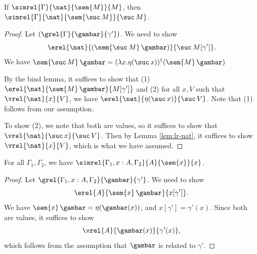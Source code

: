\begin{lemma}
    If $\simrel{\Gamma}{\nat}{\sem{M}}{M}$, then
    $\simrel{\Gamma}{\nat}{\sem{\suc\, M}}{\suc\, M}$.
\end{lemma}
\begin{proof}
    Let $(\grel{\Gamma} {\gambar} {\gamma'})$. We need to show 
    \[ \erel{\nat} {(\sem{\suc\, M}\, \gambar)} {\suc\, M[\gamma']}. \]
    We have $\sem{\suc\, M}\, \gambar = (\lambda x.\eta(\suc\, x))^\dag(\sem{M}\, \gambar)$
    
    By the bind lemma, it suffices to show that (1) $\erel{\nat}{\sem{M}\,
    \gambar}{M[\gamma']}$ and (2) for all $x, V$ such that $\vrel{\nat}{x}{V}$,
    we have $\erel{\nat}{\eta(\suc\,x)}{\suc\,V}$.
    Note that (1) follows from our assumption.

    To show (2), we note that both are values, so it suffices to show that
    $\vrel{\nat}{\suc\, x}{\suc\, V}$. Then by Lemma \ref{lem:lr-nat}, it
    suffices to show $\vrel{\nat}{x}{V}$, which is what we have assumed.    
\end{proof}

\begin{lemma}
    For all $\Gamma_1, \Gamma_2$, we have $\simrel{\Gamma_1, x : A, \Gamma_2}{A}{\sem{x}}{x}$.
\end{lemma}
\begin{proof}
    Let $\grel{\Gamma_1, x : A, \Gamma_2}{\gambar}{\gamma'}$. We need to show
    \[ \erel{A}{\sem{x}\, \gambar}{x[\gamma']}.  \]
    We have $\sem{x}\, \gambar = \eta(\gambar(x))$, and $x[\gamma'] = \gamma'(x)$.
    Since both are values, it suffices to show
    \[ \vrel{A}{\gambar(x)}{\gamma'(x)}, \]
    which follows from the assumption that $\gambar$ is related to $\gamma'$.
\end{proof}

